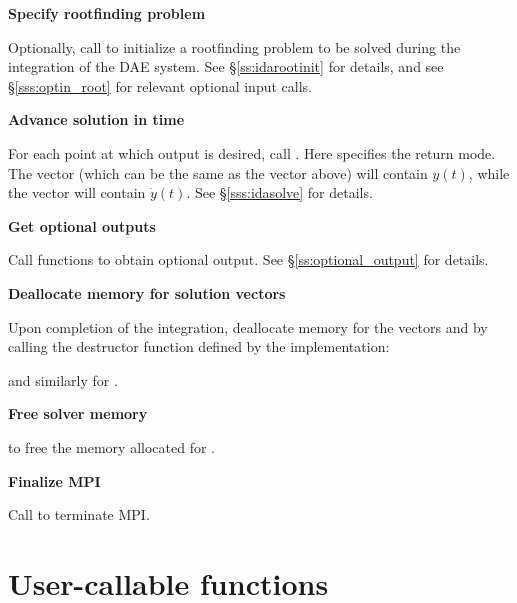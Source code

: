 \begin{Steps}
\item
  {\bf Specify rootfinding problem}

  Optionally, call  to initialize a rootfinding problem
  to be solved during the integration of the DAE system.
  See \S\ref{ss:idarootinit} for details, and see \S\ref{sss:optin_root}
  for relevant optional input calls.

\item
  {\bf Advance solution in time}

  For each point at which output is desired, call
  .
  Here  specifies the return mode.  The vector 
  (which can be the same as the vector  above) will contain $y(t)$,
  while the vector  will contain $\dot{y}(t)$.
  See \S\ref{sss:idasolve} for details.
  
\item
  {\bf Get optional outputs}

  Call  functions to obtain optional output.
  See \S\ref{ss:optional_output} for details.

\item
  {\bf Deallocate memory for solution vectors}

  Upon completion of the integration, deallocate memory for the vectors 
  and  by calling the destructor function defined by the {\nvector} 
  implementation:

  {\s} 

  {\omp} 

  {\pt} 

  {\p} 
  
  and similarly for .
  
\item
  {\bf Free solver memory}

   to free the memory allocated for {\ida}.
  
\item 
  {\bf {\p} Finalize MPI}
  
  Call  to terminate MPI.

\end{Steps}

\section{User-callable functions}\label{ss:callable_fct_sim}

